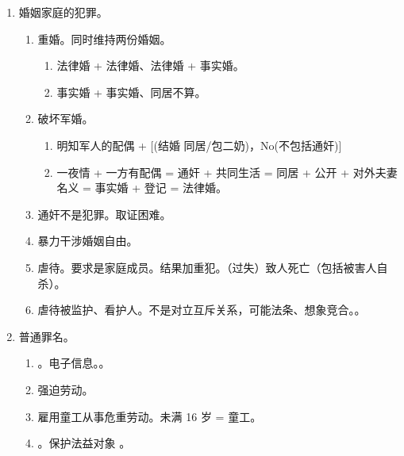 \begin{enumerate}
\begin{enumerate}
\begin{enumerate}
                \end{enumerate}
        \end{enumerate}
  \item 婚姻家庭的犯罪。
        \begin{enumerate}
          \item 重婚。同时维持两份婚姻。
                \begin{enumerate}
                  \item 法律婚 + 法律婚、法律婚 + 事实婚。
                  \item 事实婚 + 事实婚、同居不算。
                \end{enumerate}
          \item 破坏军婚。
                \begin{enumerate}
                  \item 明知军人的配偶 + [(结婚 \hz 同居/包二奶)，No(不包括通奸)]
                  \item 一夜情 + 一方有配偶 = 通奸 + 共同生活 = 同居 + 公开 + 对外夫妻名义 = 事实婚 + 登记 = 法律婚。
                \end{enumerate}
          \item 通奸不是犯罪。取证困难。
          \item 暴力干涉婚姻自由。
          \item 虐待。要求是家庭成员。\sjt 结果加重犯。（过失）致人死亡（包括被害人自杀）。
          \item 虐待被监护、看护人。不是对立互斥关系，可能法条、想象竞合。。
        \end{enumerate}
  \item 普通罪名。
        \begin{enumerate}
          \item {}。电子信息。。
          \item 强迫劳动。
          \item 雇用童工从事危重劳动。未满 16 岁 = 童工。
          \item {}。保护法益对象 \yjt {}。
        \end{enumerate}
\end{enumerate}
